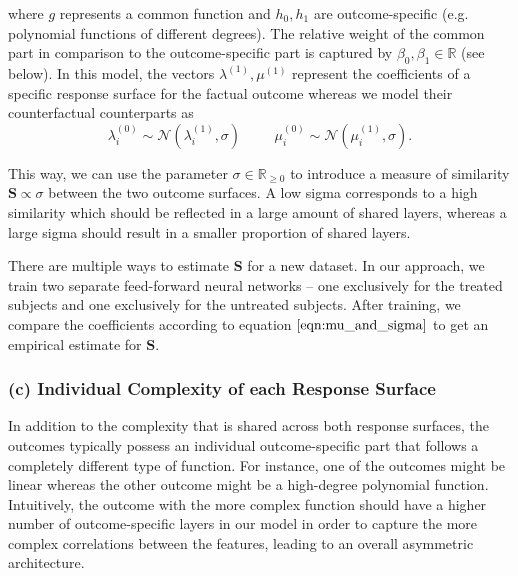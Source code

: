 where $g$ represents a common function and $h_0, h_1$ are outcome-specific (e.g. polynomial functions of different degrees). The relative weight of the common part in comparison to the outcome-specific part is captured by $\beta_0, \beta_1 \in \mathbb{R}$ (see below). In this model, the vectors $\lambda^{(1)}, \mu^{(1)}$ represent the coefficients of a specific response surface for the factual outcome whereas we model their counterfactual counterparts as
\begin{equation}
\label{eqn:mu_and_sigma}
\lambda^{(0)}_i \sim \mathcal{N}(\lambda^{(1)}_i, \sigma)  \hspace{1cm} \mu^{(0)}_i \sim \mathcal{N}(\mu^{(1)}_i, \sigma).
\end{equation}


This way, we can use the parameter $\sigma \in \mathbb{R}_{\geq0}$ to introduce a measure of similarity $\mathbf{S} \propto \sigma$ between the two outcome surfaces. A low sigma corresponds to a high similarity which should be reflected in a large amount of shared layers, whereas a large sigma should result in a smaller proportion of shared layers. 

There are multiple ways to estimate $\mathbf{S}$ for a new dataset. In our approach, we train two separate feed-forward neural networks -- one exclusively for the treated subjects and one exclusively for the untreated subjects. After training, we compare the coefficients according to equation $\ref{eqn:mu_and_sigma}$ to get an empirical estimate for $\mathbf{S}$. 

\subsubsection{(c) Individual Complexity of each Response Surface}
In addition to the complexity that is shared across both response surfaces, the outcomes typically possess an individual outcome-specific part that follows a completely different type of function. For instance, one of the outcomes might be linear whereas the other outcome might be a high-degree  polynomial function. 
Intuitively, the outcome with the more complex function should have a higher number of outcome-specific layers in our model in order to capture the more complex correlations between the features, leading to an overall asymmetric architecture. 

